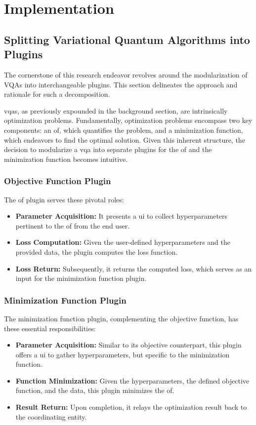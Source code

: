 \documentclass[
  a4paper,  %
  twoside,  %
  bibliography=totoc,
  headsepline,
  cleardoublepage=empty,
  parskip=half,
  draft=false
]{scrbook}
\begin{document}
\chapter{Implementation}
\label{chap:implementation}

\section{Splitting Variational Quantum Algorithms into Plugins}
\label{sec:splittingVQAsIntoPlugins}

The cornerstone of this research endeavor revolves around the modularization of VQAs into interchangeable plugins.
This section delineates the approach and rationale for such a decomposition.

\glspl{vqa}, as previously expounded in the background section, are intrinsically optimization problems.
Fundamentally, optimization problems encompass two key components: an \gls{of}, which quantifies the problem, and a minimization function, which endeavors to find the optimal solution.
Given this inherent structure, the decision to modularize a \gls{vqa} into separate plugins for the \gls{of} and the minimization function becomes intuitive.

\subsection{Objective Function Plugin}
The \gls{of} plugin serves these pivotal roles:

\begin{itemize}
\item \textbf{Parameter Acquisition:} It presents a \gls{ui} to collect hyperparameters pertinent to the \gls{of} from the end user.
\item \textbf{Loss Computation:} Given the user-defined hyperparameters and the provided data, the plugin computes the loss function.
\item \textbf{Loss Return:} Subsequently, it returns the computed loss, which serves as an input for the minimization function plugin.
\end{itemize}

\subsection{Minimization Function Plugin}
The minimization function plugin, complementing the objective function, has these essential responsibilities:

\begin{itemize}
\item \textbf{Parameter Acquisition:} Similar to its objective counterpart, this plugin offers a \gls{ui} to gather hyperparameters, but specific to the minimization function.
\item \textbf{Function Minimization:} Given the hyperparameters, the defined objective function, and the data, this plugin minimizes the \gls{of}.
\item \textbf{Result Return:} Upon completion, it relays the optimization result back to the coordinating entity.
\end{itemize}
\end{document}
